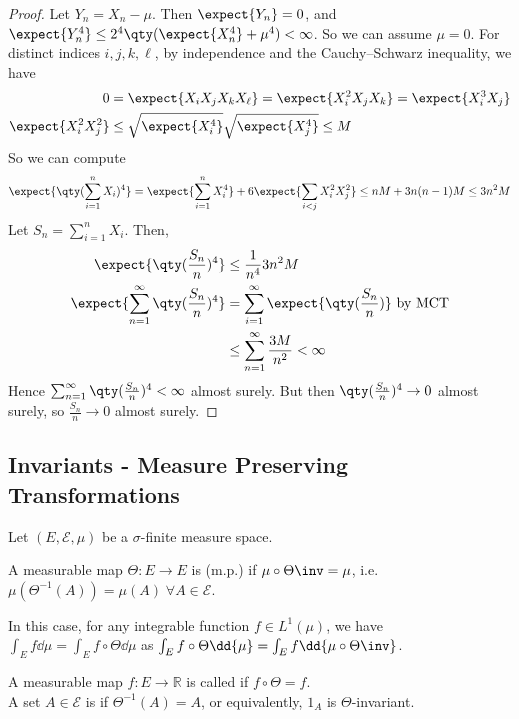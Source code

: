 \begin{proof}
	Let $Y_n = X_n - \mu$.
	Then $\expect{Y_n} = 0$, and $\expect{Y_n^4} \leq 2^4 \qty(\expect{X_n^4} + \mu^4) < \infty$.
	So we can assume $\mu = 0$.
	For distinct indices $i, j, k, \ell$, by independence and the Cauchy--Schwarz inequality, we have
	\begin{align*}
        0 &= \expect{X_i X_j X_k X_\ell} = \expect{X_i^2 X_j X_k} = \expect{X_i^3 X_j} \\
		\expect{X_i^2 X_j^2} &\leq \sqrt{\expect{X_i^4}}\sqrt{\expect{X_j^4}} \leq M
    \end{align*}
	So we can compute
	\begin{align*}
		\expect{\qty(\sum_{i=1}^n X_i)^4} = \expect{\sum_{i=1}^n X_i^4} + 6\expect{\sum_{i < j} X_i^2 X_j^2} \leq nM + 3n(n-1)M \leq 3n^2 M
    \end{align*}
	Let $S_n = \sum_{i=1}^n X_i$.
	Then,
	\begin{align*}
		\expect{\qty(\frac{S_n}{n})^4} &\leq \frac{1}{n^4} 3n^2 M \\
        \expect{\sum_{n=1}^\infty \qty(\frac{S_n}{n})^4} &= \sum_{i=1}^{\infty} \expect{\qty(\frac{S_n}{n})} \text{ by MCT} \\
		&\leq \sum_{n=1}^\infty \frac{3M}{n^2} < \infty
    \end{align*}
	Hence $\sum_{n=1}^\infty \qty(\frac{S_n}{n})^4 < \infty$ almost surely.
	But then $\qty(\frac{S_n}{n})^4 \to 0$ almost surely, so $\frac{S_n}{n} \to 0$ almost surely.
\end{proof}

\subsection{Invariants - Measure Preserving Transformations}

Let $(E, \mathcal E, \mu)$ be a $\sigma$-finite measure space.

\begin{definition}
	A measurable map $\Theta \colon E \to E$ is  (m.p.) if $\mu \circ \Theta\inv = \mu$, i.e. $\mu(\Theta^{-1}(A)) = \mu(A) \; \forall A \in \mathcal E$.
\end{definition}

In this case, for any integrable function $f \in L^1(\mu)$, we have $\int_E f \dd{\mu} = \int_E f \circ \Theta \dd{\mu}$ as $\int_E f \circ \Theta \dd{\mu} = \int_E f \dd{\mu \circ \Theta\inv}$.

\begin{definition}
	A measurable map $f \colon E \to \mathbb R$ is called  if $f \circ \Theta = f$. \\
	A set $A \in \mathcal E$ is  if $\Theta^{-1}(A) = A$, or equivalently, $1_A$ is $\Theta$-invariant.
\end{definition}

